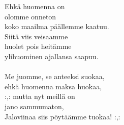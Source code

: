 Ehkä huomenna on \\ olomme onneton \\ koko maailma päällemme kaatuu. \\ Siitä viis veisaamme \\ huolet pois heitämme \\ ylihuominen ajallansa saapuu. \\ \hspace{10mm} \\ Me juomme, se anteeksi suokaa, \\ ehkä huomenna maksa huokaa, \\ :,: mutta nyt meillä on \\ jano sammumaton, \\ Jaloviinaa siis pöytäämme tuokaa! :,: